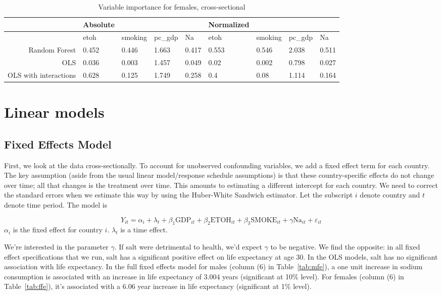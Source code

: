 \documentclass[11pt]{article}\usepackage[]{graphicx}\usepackage[]{color}
\newcommand{\eps}{\varepsilon}
\begin{document}
\begin{table}[ht]
\centering
\begin{tabular}{r|llll|llll}
   \hline
 & Absolute &  &  &  & Normalized &  &  &  \\ 
   \hline
   & etoh & smoking & pc\_gdp & Na & etoh & smoking & pc\_gdp & Na \\ 
   \hline
Random Forest & 0.452 & 0.446 & 1.663 & 0.417 & 0.553 & 0.546 & 2.038 & 0.511 \\ 
  OLS & 0.036 & 0.003 & 1.457 & 0.049 & 0.02 & 0.002 & 0.798 & 0.027 \\ 
  OLS with interactions & 0.628 & 0.125 & 1.749 & 0.258 & 0.4 & 0.08 & 1.114 & 0.164 \\ 
   \hline
\end{tabular}
\caption{Variable importance for females, cross-sectional} 
\end{table}


\newpage

\section{Linear models}


\subsection{Fixed Effects Model}
First, we look at the data cross-sectionally.
To account for unobserved confounding variables, we add a fixed effect term for each country.
The key assumption (aside from the usual linear model/response schedule assumptions) is that these country-specific effects do not change over time; all that changes is the treatment over time.
This amounts to estimating a different intercept for each country.
We need to correct the standard errors when we estimate this way by using the Huber-White Sandwich estimator.
Let the subscript $i$ denote country and $t$ denote time period.
The model is

$$Y_{it} = \alpha_i + \lambda_t + \beta_1\text{GDP}_{it} +  \beta_2\text{ETOH}_{it} +  \beta_3\text{SMOKE}_{it} + \gamma\text{Na}_{it} + \eps_{it}$$
$\alpha_i$ is the fixed effect for country $i$.
$\lambda_t$ is a time effect.

We're interested in the parameter $\gamma$.
If salt were detrimental to health, we'd expect $\gamma$ to be negative.
We find the opposite: in all fixed effect specifications that we run, salt has a significant positive effect on life expectancy at age 30.
In the OLS models, salt has no significant association with life expectancy.
In the full fixed effects model for males (column (6) in Table~\ref{tab:mfe}), a one unit increase in sodium consumption is associated with an increase in life expectancy of $3.004$ years (significant at 10\% level).
For females (column (6) in Table~\ref{tab:ffe}), it's associated with a $6.06$ year increase in life expectancy (significant at 1\% level).
\end{document}
